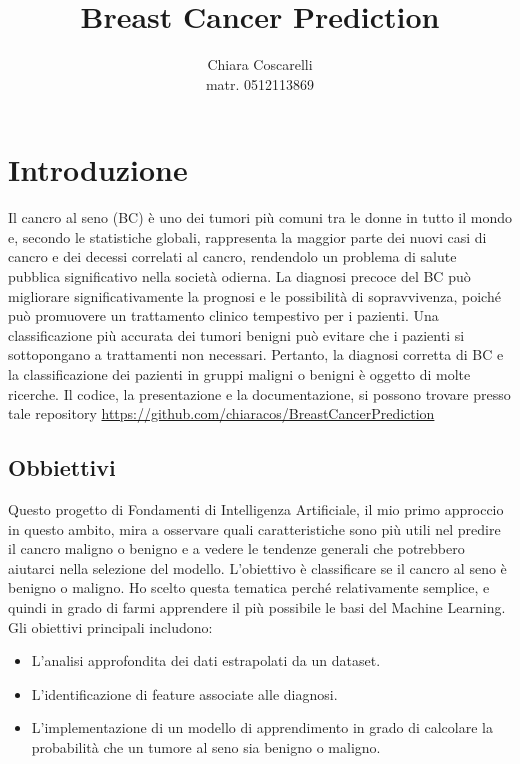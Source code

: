 \documentclass{article}
\title{Breast Cancer Prediction}
\author{Chiara Coscarelli\\[1ex]matr. 0512113869}
\begin{document}
\maketitle

\newpage
\tableofcontents
\newpage
\section{Introduzione}

Il cancro al seno (BC) è uno dei tumori più comuni tra le donne in tutto il mondo e, secondo le statistiche globali, rappresenta la maggior parte dei nuovi casi di cancro e dei decessi correlati al cancro, rendendolo un problema di salute pubblica significativo nella società odierna. La diagnosi precoce del BC può migliorare significativamente la prognosi e le possibilità di sopravvivenza, poiché può promuovere un trattamento clinico tempestivo per i pazienti. Una classificazione più accurata dei tumori benigni può evitare che i pazienti si sottopongano a trattamenti non necessari. Pertanto, la diagnosi corretta di BC e la classificazione dei pazienti in gruppi maligni o benigni è oggetto di molte ricerche.
Il codice, la presentazione e la documentazione, si possono trovare presso tale repository
\url{https://github.com/chiaracos/BreastCancerPrediction}


\subsection{Obbiettivi}
Questo progetto di Fondamenti di Intelligenza Artificiale, il mio primo approccio in questo ambito, mira a osservare quali caratteristiche sono più utili nel predire il cancro maligno o benigno e a vedere le tendenze generali che potrebbero aiutarci nella selezione del modello. L’obiettivo è classificare se il cancro al seno è benigno o maligno. Ho scelto questa tematica perché relativamente semplice, e quindi in grado di farmi apprendere il più possibile le basi del Machine Learning.
Gli obiettivi principali includono:
\begin{itemize}
    \item L'analisi approfondita dei dati estrapolati da un dataset.
    \item L'identificazione di feature associate alle diagnosi.
    \item L'implementazione di un modello di apprendimento in grado di calcolare la probabilità che un tumore al seno sia benigno o maligno.
\end{itemize}
\end{document}
